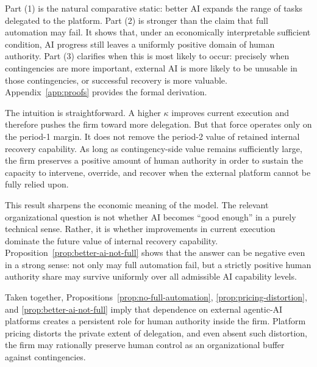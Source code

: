 Part (1) is the natural comparative static: better AI expands the range of tasks delegated to the platform. Part (2) is stronger than the claim that full automation may fail. It shows that, under an economically interpretable sufficient condition, AI progress still leaves a uniformly positive domain of human authority. Part (3) clarifies when this is most likely to occur: precisely when contingencies are more important, external AI is more likely to be unusable in those contingencies, or successful recovery is more valuable. Appendix~\ref{app:proofs} provides the formal derivation.

The intuition is straightforward. A higher $\kappa$ improves current execution and therefore pushes the firm toward more delegation. But that force operates only on the period-1 margin. It does not remove the period-2 value of retained internal recovery capability. As long as contingency-side value remains sufficiently large, the firm preserves a positive amount of human authority in order to sustain the capacity to intervene, override, and recover when the external platform cannot be fully relied upon.

This result sharpens the economic meaning of the model. The relevant organizational question is not whether AI becomes ``good enough'' in a purely technical sense. Rather, it is whether improvements in current execution dominate the future value of internal recovery capability. Proposition~\ref{prop:better-ai-not-full} shows that the answer can be negative even in a strong sense: not only may full automation fail, but a strictly positive human authority share may survive uniformly over all admissible AI capability levels.

Taken together, Propositions~\ref{prop:no-full-automation}, \ref{prop:pricing-distortion}, and \ref{prop:better-ai-not-full} imply that dependence on external agentic-AI platforms creates a persistent role for human authority inside the firm. Platform pricing distorts the private extent of delegation, and even absent such distortion, the firm may rationally preserve human control as an organizational buffer against contingencies.
